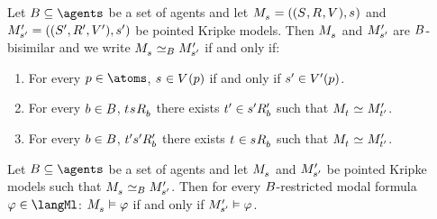 \begin{definition}
Let $\agentsB \subseteq \agents$ be a set of agents and let $\kPModelAndTuple{\kStateS}$ and $\kPModelAndTupleP{\kStateSP}$ be pointed Kripke models.
Then $\kPModel{\kStateS}$ and ${M^{\prime}_{{s}^{\prime}}}$ are $B$-bisimilar and we write $\kPModel{\kStateS} \bisimilar[\agentsB] \kPModelP{\kStateSP}$ if and only if:
\begin{enumerate}
    \item For every $\atomP \in \atoms$, $\kStateS \in \kValuation(\atomP)$ if and only if ${s}^{\prime} \in {V^{\prime}}(p)$.
    \item For every $b \in B$, $\kStateT \kSuccessorsB{\kStateS}$ there exists ${t}^{\prime} \in {{s}^{\prime}} {R^{\prime}_{b}}$ such that $\kPModel{\kStateT} \bisimilar \kPModelP{\kStateTP}$.
    \item For every $b \in B$, ${t}^{\prime} {{s}^{\prime}} {R^{\prime}_{b}}$ there exists $\kStateT \in \kSuccessorsB{\kStateS}$ such that $\kPModel{\kStateT} \bisimilar \kPModelP{\kStateTP}$.
\end{enumerate}

\end{definition}

\begin{lemma}\label{b-restricted-invariance}
Let $\agentsB \subseteq \agents$ be a set of agents and let $\kPModel{\kStateS}$ and ${M^{\prime}_{{s}^{\prime}}}$ be pointed Kripke models such that $\kPModel{\kStateS} \bisimilar[\agentsB] \kPModelP{\kStateSP}$.
Then for every $B$-restricted modal formula $\phi \in \langMl$:
$\kPModel{\kStateS} \entails \phi$ if and only if ${M^{\prime}_{{s}^{\prime}}} \vDash \varphi$.
\end{lemma}

